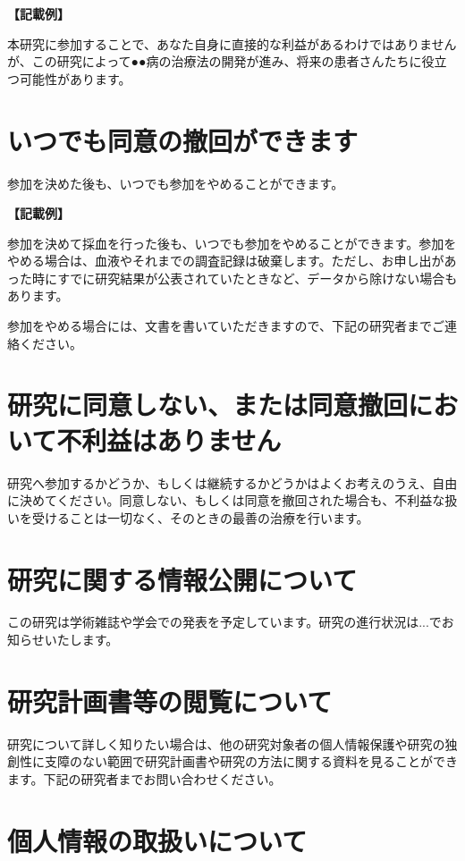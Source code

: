 \documentclass[a4paper,11pt,lualatex,ja=standard]{bxjsarticle}
\begin{document}
\textbf{【記載例】}

本研究に参加することで、あなた自身に直接的な利益があるわけではありませんが、この研究によって●●病の治療法の開発が進み、将来の患者さんたちに役立つ可能性があります。

\section{いつでも同意の撤回ができます}

参加を決めた後も、いつでも参加をやめることができます。

\textbf{【記載例】}

参加を決めて採血を行った後も、いつでも参加をやめることができます。参加をやめる場合は、血液やそれまでの調査記録は破棄します。ただし、お申し出があった時にすでに研究結果が公表されていたときなど、データから除けない場合もあります。

参加をやめる場合には、文書を書いていただきますので、下記の研究者までご連絡ください。

\section{研究に同意しない、または同意撤回において不利益はありません}

研究へ参加するかどうか、もしくは継続するかどうかはよくお考えのうえ、自由に決めてください。同意しない、もしくは同意を撤回された場合も、不利益な扱いを受けることは一切なく、そのときの最善の治療を行います。

\section{研究に関する情報公開について}

この研究は学術雑誌や学会での発表を予定しています。研究の進行状況は...でお知らせいたします。

\section{研究計画書等の閲覧について}

研究について詳しく知りたい場合は、他の研究対象者の個人情報保護や研究の独創性に支障のない範囲で研究計画書や研究の方法に関する資料を見ることができます。下記の研究者までお問い合わせください。

\section{個人情報の取扱いについて}
\end{document}

